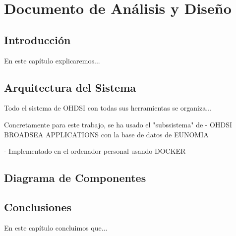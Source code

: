 \chapter{Documento de Análisis y Diseño}\label{cap:07diseño}

\section{Introducción}
En este capítulo explicaremos...

\section{Arquitectura del Sistema}

Todo el sistema de OHDSI con todas sus herramientas se organiza...


Concretamente para este trabajo,
se ha usado el "subssistema" de
- OHDSI BROADSEA APPLICATIONS con la base de datos de EUNOMIA



- Implementado en el ordenador personal usando DOCKER








\section{Diagrama de Componentes}


\section{Conclusiones}
En este capítulo concluimos que...
